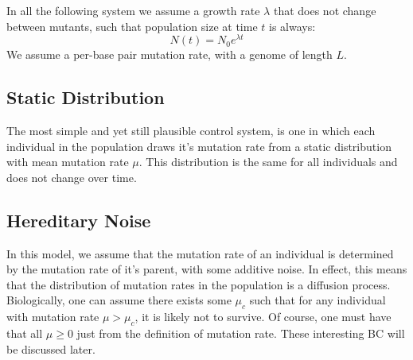 In all the following system we assume a growth rate $\lambda$ that does not change between mutants,
such that population size at time \(t \) is always:
\begin{equation}
    N(t) = N_{0} e^{\lambda t}
    \label{eq:growth}
\end{equation}
We assume a per-base pair mutation rate, with a genome of length \(L\).

\subsection{Static Distribution}\label{subsec:static}
    The most simple and yet still plausible control system, is one in which each individual in the population draws it's mutation rate
    from a static distribution with mean mutation rate $\mu$.
    This distribution is the same for all individuals and does not change over time.

\subsection{Hereditary Noise}\label{subsec:hereditary}
    In this model, we assume that the mutation rate of an individual is determined by the mutation rate of it's parent, with some additive noise.
    In effect, this means that the distribution of mutation rates in the population is a diffusion process.
    Biologically, one can assume there exists some \( \mu_c \) such that for any individual with mutation rate \( \mu > \mu_c \), it is likely not to survive.
    Of course, one must have that all \( \mu \geq 0 \) just from the definition of mutation rate.
    These interesting BC will be discussed later.

